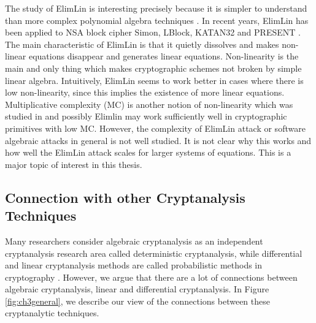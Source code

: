 The study of ElimLin is interesting \cite{ElimLinRevisit,ElimLinUniversalEqs}
precisely because it is simpler to understand than more complex
polynomial algebra techniques \cite{XL,XL2,XLAsEstCourt04,Bardet,DoSemiRegularSequencesExist}. In recent years, ElimLin has been applied to NSA block cipher Simon, LBlock, KATAN32 and PRESENT \cite{courtois2014combined,RaddumSimon,ElimLinUniversalEqs,nakahara2009linear}. The main characteristic of ElimLin is that it quietly dissolves
and makes non-linear equations disappear and generates linear equations. Non-linearity is the main and only thing which makes cryptographic schemes not broken by simple linear algebra. Intuitively, ElimLin seems to work better in cases where there is low non-linearity, since this implies the existence of more linear equations.  Multiplicative complexity (MC) is another notion of non-linearity which was studied in \cite{FourMNL,OptimiPaper2,TheoPhD} and possibly Elimlin may work sufficiently well in cryptographic primitives with low MC.
However, the complexity of ElimLin attack or software algebraic attacks in general is not well studied. It is not clear why this works and how well the ElimLin attack scales for larger systems of equations. This is a major topic of interest in this thesis.

\subsection{Connection with other Cryptanalysis Techniques}
Many researchers consider algebraic cryptanalysis as an independent cryptanalysis research area called deterministic cryptanalysis, while differential and linear cryptanalysis methods are called probabilistic methods in cryptography \cite{pasalic2009probabilistic}. However, we argue that there are a lot of connections between algebraic cryptanalysis, linear and differential cryptanalysis. In Figure \ref{fig:ch3general}, we describe our view of the connections between these cryptanalytic techniques.

